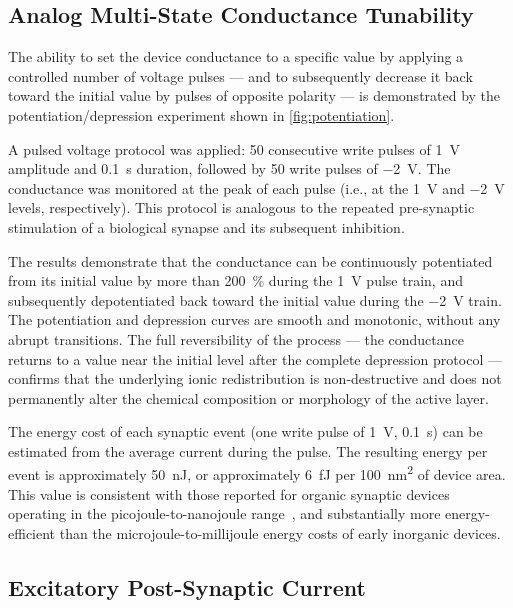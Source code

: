 \documentclass[12pt, a4paper, twoside]{report}
\begin{document}
\subsection{Analog Multi-State Conductance Tunability}\label{subsec:multistate}

The ability to set the device conductance to a specific value by applying a controlled number of voltage pulses — and to subsequently decrease it back toward the initial value by pulses of opposite polarity — is demonstrated by the potentiation/depression experiment shown in \cref{fig:potentiation}.

A pulsed voltage protocol was applied: 50 consecutive write pulses of \SI{+1}{\volt} amplitude and \SI{0.1}{\second} duration, followed by 50 write pulses of \SI{-2}{\volt}. The conductance was monitored at the peak of each pulse (i.e., at the \SI{+1}{\volt} and \SI{-2}{\volt} levels, respectively). This protocol is analogous to the repeated pre-synaptic stimulation of a biological synapse and its subsequent inhibition.

The results demonstrate that the conductance can be continuously potentiated from its initial value by more than \SI{200}{\percent} during the \SI{+1}{\volt} pulse train, and subsequently depotentiated back toward the initial value during the \SI{-2}{\volt} train. The potentiation and depression curves are smooth and monotonic, without any abrupt transitions. The full reversibility of the process — the conductance returns to a value near the initial level after the complete depression protocol — confirms that the underlying ionic redistribution is non-destructive and does not permanently alter the chemical composition or morphology of the active layer.

The energy cost of each synaptic event (one write pulse of \SI{1}{\volt}, \SI{0.1}{\second}) can be estimated from the average current during the pulse. The resulting energy per event is approximately \SI{50}{\nano\joule}, or approximately \SI{6}{\femto\joule} per \SI{100}{\nano\metre\squared} of device area. This value is consistent with those reported for organic synaptic devices operating in the picojoule-to-nanojoule range~\cite{Xiao2016}, and substantially more energy-efficient than the microjoule-to-millijoule energy costs of early inorganic devices.

\subsection{Excitatory Post-Synaptic Current}\label{subsec:epsc}
\end{document}
